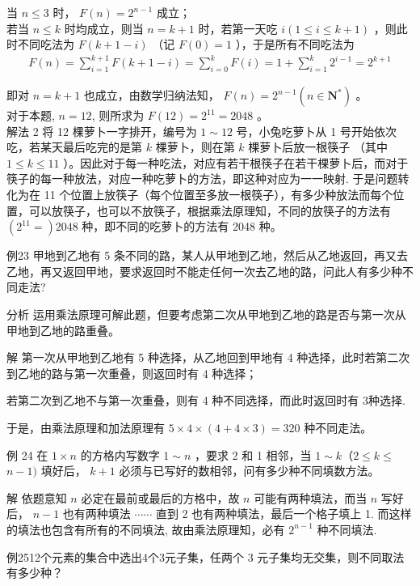 \documentclass[10pt]{article}
\begin{document}
当 $n \leqslant 3$ 时， $F(n)=2^{n-1}$ 成立；\\
若当 $n \leqslant k$ 时均成立，则当 $n=k+1$ 时，若第一天吃 $i(1 \leqslant i \leqslant k+1)$ ，则此时不同吃法为 $F(k+1-i)$ （记 $F(0)=1$ ），于是所有不同吃法为\\
\begin{align*}
F(n)=\sum_{i=1}^{k+1} F(k+1-i)=\sum_{i=0}^{k} F(i)=1+\sum_{i=1}^{k} 2^{i-1}=2^{k+1}
\end{align*}

即对 $n=k+1$ 也成立，由数学归纳法知， $F(n)=2^{n-1}\left(n \in \mathbf{N}^{*}\right)$ 。\\
对于本题, $n=12$, 则所求为 $F(12)=2^{11}=2048$ 。\\
解法 2 将 12 棵萝卜一字排开，编号为 $1 \sim 12$ 号，小兔吃萝卜从 1 号开始依次吃，若某天最后吃完的是第 $k$ 棵萝卜，则在第 $k$ 棵萝卜后放一根筷子 （其中 $1 \leqslant k \leqslant 11$ ）。因此对于每一种吃法，对应有若干根筷子在若干棵萝卜后，而对于筷子的每一种放法，对应一种吃萝卜的方法，即这种对应为一一映射. 于是问题转化为在 11 个位置上放筷子（每个位置至多放一根筷子），有多少种放法而每个位置，可以放筷子，也可以不放筷子，根据乘法原理知，不同的放筷子的方法有 $\left(2^{11}=\right) 2048$ 种，即不同的吃萝卜的方法有 2048 种。

例23 甲地到乙地有 5 条不同的路，某人从甲地到乙地，然后从乙地返回，再又去乙地，再又返回甲地，要求返回时不能走任何一次去乙地的路，问此人有多少种不同走法?

分析 运用乘法原理可解此题，但要考虑第二次从甲地到乙地的路是否与第一次从甲地到乙地的路重叠。

解 第一次从甲地到乙地有 5 种选择，从乙地回到甲地有 4 种选择，此时若第二次到乙地的路与第一次重叠，则返回时有 4 种选择；

若第二次到乙地不与第一次重叠，则有 4 种不同选择，而此时返回时有 3种选择.

于是，由乘法原理和加法原理有 $5 \times 4 \times(4+4 \times 3)=320$ 种不同走法。

例 24 在 $1 \times n$ 的方格内写数字 $1 \sim n$ ，要求 2 和 1 相邻，当 $1 \sim k （ 2 \leqslant k \leqslant$ $n-1)$ 填好后， $k+1$ 必须与已写好的数相邻，问有多少种不同填数方法。

解 依题意知 $n$ 必定在最前或最后的方格中，故 $n$ 可能有两种填法，而当 $n$ 写好后， $n-1$ 也有两种填法 $\cdots \cdots$ 直到 2 也有两种填法，最后一个格子填上 1. 而这样的填法也包含有所有的不同填法, 故由乘法原理知，必有 $2^{n-1}$ 种不同填法.

例2512个元素的集合中选出4个3元子集，任两个 3 元子集均无交集，则不同取法有多少种？
\end{document}
